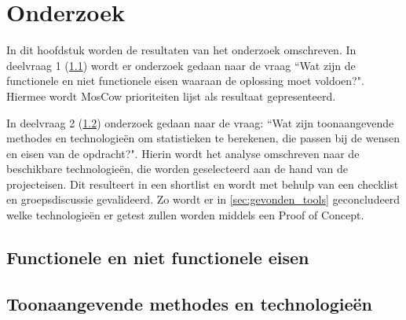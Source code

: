 \chapter{Onderzoek}





In dit hoofdstuk worden de resultaten van het onderzoek omschreven.  In deelvraag 1 (\ref{sec:deelvraag1}) wordt er onderzoek gedaan naar de vraag ``Wat zijn de functionele en niet functionele eisen waaraan de oplossing moet voldoen?". Hiermee wordt MosCow prioriteiten lijst als resultaat gepresenteerd.

In deelvraag 2 (\ref{sec:deelvraag2}) onderzoek gedaan naar de vraag: ``Wat zijn toonaangevende methodes en technologieën om statistieken te berekenen, die passen bij de wensen en eisen van de opdracht?". Hierin wordt het analyse omschreven naar de beschikbare technologieën, die worden geselecteerd aan de hand van de projecteisen. Dit resulteert in een shortlist en wordt met behulp van een checklist en groepsdiscussie gevalideerd. Zo wordt er in \ref{sec:gevonden_tools} geconcludeerd welke technologieën er getest zullen worden middels een Proof of Concept.

\clearpage

\section{Functionele en niet functionele eisen}
\label{sec:deelvraag1}


\clearpage

\section{Toonaangevende methodes en technologieën}
\label{sec:deelvraag2}


